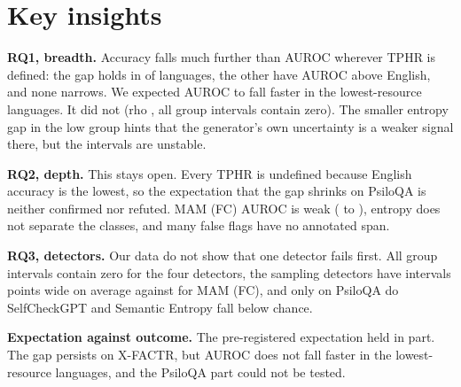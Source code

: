 \documentclass[12pt]{article}
\begin{document}
\section{Key insights}
\textbf{RQ1, breadth.} Accuracy falls much further than AUROC wherever TPHR is defined: the gap holds in \xfholdsn{} of \xfn{} languages, the other \xfundefn{} have AUROC above English, and none narrows. We expected AUROC to fall faster in the lowest-resource languages. It did not (rho \rhoau{}, all group intervals contain zero). The smaller entropy gap in the low group hints that the generator's own uncertainty is a weaker signal there, but the intervals are unstable.

\textbf{RQ2, depth.} This stays open. Every TPHR is undefined because English accuracy is the lowest, so the expectation that the gap shrinks on PsiloQA is neither confirmed nor refuted. MAM (FC) AUROC is weak (\psfclo{} to \psfchi{}), entropy does not separate the classes, and many false flags have no annotated span.

\textbf{RQ3, detectors.} Our data do not show that one detector fails first. All group intervals contain zero for the four detectors, the sampling detectors have intervals \wsamp{} points wide on average against \wmam{} for MAM (FC), and only on PsiloQA do SelfCheckGPT and Semantic Entropy fall below chance.

\textbf{Expectation against outcome.} The pre-registered expectation held in part. The gap persists on X-FACTR, but AUROC does not fall faster in the lowest-resource languages, and the PsiloQA part could not be tested.
\end{document}
